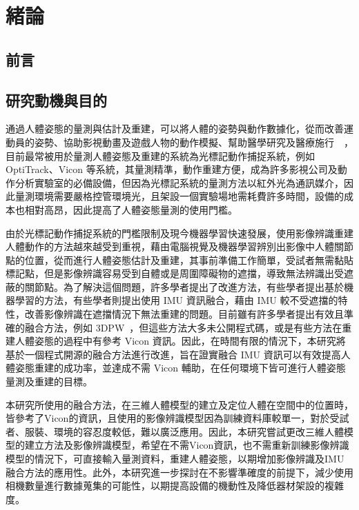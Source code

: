 \chapter{緒論}
\fontsize{12pt}{18pt}\selectfont

\section{前言}



\section{研究動機與目的}
通過人體姿態的量測與估計及重建，可以將人體的姿勢與動作數據化，從而改善運動員的姿勢、協助影視動畫及遊戲人物的動作模擬、幫助醫學研究及醫療施行~\cite{tsakanikas2020evaluating}~\cite{zhao2017imu}，目前最常被用於量測人體姿態及重建的系統為光標記動作捕捉系統，例如 OptiTrack、Vicon 等系統，其量測精準，動作重建方便，成為許多影視公司及動作分析實驗室的必備設備，但因為光標記系統的量測方法以紅外光為通訊媒介，因此量測環境需要嚴格控管環境光，且架設一個實驗場地需耗費許多時間，設備的成本也相對高昂，因此提高了人體姿態量測的使用門檻。

由於光標記動作捕捉系統的門檻限制及現今機器學習快速發展，使用影像辨識重建人體動作的方法越來越受到重視，藉由電腦視覺及機器學習辨別出影像中人體關節點的位置，從而進行人體姿態估計及重建，其事前準備工作簡單，受試者無需黏貼標記點，但是影像辨識容易受到自體或是周圍障礙物的遮擋，導致無法辨識出受遮蔽的關節點。為了解決這個問題，許多學者提出了改進方法，有些學者提出基於機器學習的方法，有些學者則提出使用 IMU 資訊融合，藉由 IMU 較不受遮擋的特性，改善影像辨識在遮擋情況下無法重建的問題。目前雖有許多學者提出有效且準確的融合方法，例如 3DPW~\cite{vonMarcard2018}，但這些方法大多未公開程式碼，或是有些方法在重建人體姿態的過程中有參考 Vicon 資訊。因此，在時間有限的情況下，本研究將基於一個程式開源的融合方法進行改進，旨在證實融合 IMU 資訊可以有效提高人體姿態重建的成功率，並達成不需 Vicon 輔助，在任何環境下皆可進行人體姿態量測及重建的目標。

本研究所使用的融合方法，在三維人體模型的建立及定位人體在空間中的位置時，皆參考了Vicon的資訊，且使用的影像辨識模型因為訓練資料庫較單一，對於受試者、服裝、環境的容忍度較低，難以廣泛應用。因此，本研究嘗試更改三維人體模型的建立方法及影像辨識模型，希望在不需Vicon資訊，也不需重新訓練影像辨識模型的情況下，可直接輸入量測資料，重建人體姿態，以期增加影像辨識及IMU融合方法的應用性。此外，本研究進一步探討在不影響準確度的前提下，減少使用相機數量進行數據蒐集的可能性，以期提高設備的機動性及降低器材架設的複雜度。

